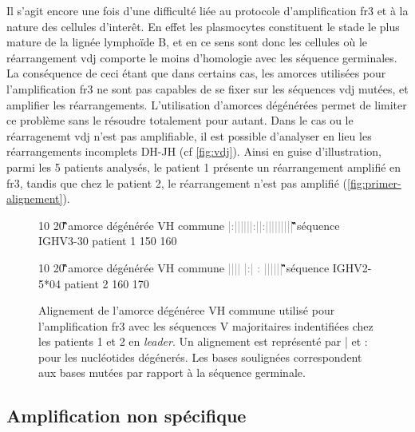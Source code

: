 Il s'agit encore une fois d'une difficulté liée au protocole d'amplification \gls{fr}3 et à la nature des cellules d'interêt. 
En effet les plasmocytes constituent le stade le plus mature de la lignée lymphoïde B, et en ce sens sont donc les cellules où le 
réarrangement \gls{vdj} comporte le moins d'homologie avec les séquence germinales. La conséquence de ceci étant que dans certains 
cas, les amorces utilisées pour l'amplification \gls{fr}3 ne sont pas capables de se fixer sur les séquences \gls{vdj} mutées, et 
amplifier les réarrangements. L'utilisation d'amorces dégénérées permet de limiter ce problème sans le résoudre totalement pour autant. 
Dans le cas ou le réarragenemt \gls{vdj} n'est pas amplifiable, il est possible d'analyser en lieu les réarrangements incomplets DH-JH 
(cf \autoref{fig:vdj}). Ainsi en guise d'illustration, parmi les 5 patients analysés, le patient 1 présente un réarrangement amplifié 
en \gls{fr}3, tandis que chez le patient 2, le réarrangement n'est pas amplifié (\autoref{fig:primer-alignement}).

\begin{figure}[H]
    \centering
    \begin{ColoredVerbatim}
                10         20 
        \G\Hbase\G\G\A\C\A\C\N\G\C\Y\G\T\G\T\A\T\T\A\C amorce dégénérée VH commune
        \textcolor{gray}{|:||||||:||:|||||||||}
        \G\A\G\G\A\C\A\C\G\G\C\T\G\T\G\T\A\T\T\A\C séquence IGHV3-30 patient 1
           150       160

              10        20 
        \G\G\A\C\A\C\N\G\C\Y\G\T\G\T\A\T\T\A\C amorce dégénérée VH commune
        \textcolor{gray}{|||| |:| :   ||||||}
        \G\G\A\C\Tb\C\A\G\G\C\A\C\Tb\T\A\T\T\A\C séquence IGHV2-5*04 patient 2
             160       170
    \end{ColoredVerbatim}
    \caption{
        Alignement de l'amorce dégénéree VH commune utilisé pour l'amplification \gls{fr}3 
        avec les séquences V majoritaires indentifiées chez les patients 1 et 2 en \textit{leader}. 
        Un alignement est représenté par | et : pour les nucléotides dégénerés. Les bases soulignées 
        correspondent aux bases mutées par rapport à la séquence germinale.
    }
    \label{fig:primer-alignement}
    \end{figure}
    
\subsection{Amplification non spécifique}

